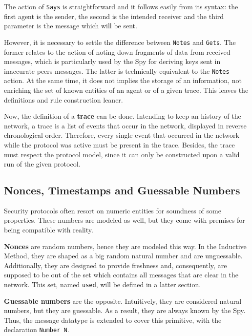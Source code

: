 The action of \texttt{Says} is straightforward and it follows easily from its syntax: the first agent is the sender, the second is the intended receiver and the third parameter is the message which will be sent.

However, it is necessary to settle the difference between \texttt{Notes} and \texttt{Gets}. The former relates to the action of noting down fragments of data from received messages, which is particularly used by the Spy for deriving keys sent in inaccurate peers messages. The latter is technically equivalent to the \texttt{Notes} action. At the same time, it does not implies the storage of an information, not enriching the set of known entities of an agent or of a given trace. This leaves the definitions and rule construction leaner.

Now, the definition of a \textbf{trace} can be done. Intending to keep an history of the network, a trace is a list of events that occur in the network, displayed in reverse chronological order. Therefore, every single event that occurred in the network while the protocol was active must be present in the trace. Besides, the trace must respect the protocol model, since it can only be constructed upon a valid run of the given protocol.




\subsection{Nonces, Timestamps and Guessable Numbers}
Security protocols often resort on numeric entities for soundness of some properties. These numbers are modeled as well, but they come with premises for being compatible with reality.

\textbf{Nonces} are random numbers, hence they are modeled this way. In the Inductive Method, they are shaped as a big random natural number and are unguessable. Additionally, they are designed to provide freshness and, consequently, are supposed to be out of the set which contains all messages that are clear in the network. This set, named \texttt{used}, will be defined in a latter section.

\textbf{Guessable numbers} are the opposite. Intuitively, they are considered natural numbers, but they are guessable. As a result, they are always known by the Spy. Thus, the message datatype is extended to cover this primitive, with the declaration \texttt{Number N}.

